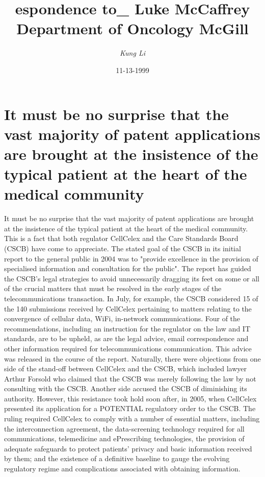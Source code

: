 \documentclass{article}%
\title{espondence to\_ Luke McCaffrey Department of Oncology McGill}%
\author{\textit{Kung Li}}%
\date{11-13-1999}%
\begin{document}
%
\normalsize%
\maketitle%
\section{It must be no surprise that the vast majority of patent applications are brought at the insistence of the typical patient at the heart of the medical community}%
\label{sec:Itmustbenosurprisethatthevastmajorityofpatentapplicationsarebroughtattheinsistenceofthetypicalpatientattheheartofthemedicalcommunity}%
It must be no surprise that the vast majority of patent applications are brought at the insistence of the typical patient at the heart of the medical community. This is a fact that both regulator CellCelex and the Care Standards Board (CSCB) have come to appreciate.\newline%
The stated goal of the CSCB in its initial report to the general public in 2004 was to "provide excellence in the provision of specialised information and consultation for the public". The report has guided the CSCB’s legal strategies to avoid unnecessarily dragging its feet on some or all of the crucial matters that must be resolved in the early stages of the telecommunications transaction.\newline%
In July, for example, the CSCB considered 15 of the 140 submissions received by CellCelex pertaining to matters relating to the convergence of cellular data, WiFi, in{-}network communications. Four of the recommendations, including an instruction for the regulator on the law and IT standards, are to be upheld, as are the legal advice, email correspondence and other information required for telecommunications communication. This advice was released in the course of the report.\newline%
Naturally, there were objections from one side of the stand{-}off between CellCelex and the CSCB, which included lawyer Arthur Forsold who claimed that the CSCB was merely following the law by not consulting with the CSCB. Another side accused the CSCB of diminishing its authority.\newline%
However, this resistance took hold soon after, in 2005, when CellCelex presented its application for a POTENTIAL regulatory order to the CSCB. The ruling required CellCelex to comply with a number of essential matters, including the interconnection agreement, the data{-}screening technology required for all communications, telemedicine and ePrescribing technologies, the provision of adequate safeguards to protect patients' privacy and basic information received by them; and the existence of a definitive baseline to gauge the evolving regulatory regime and complications associated with obtaining information.\newline%
\end{document}
